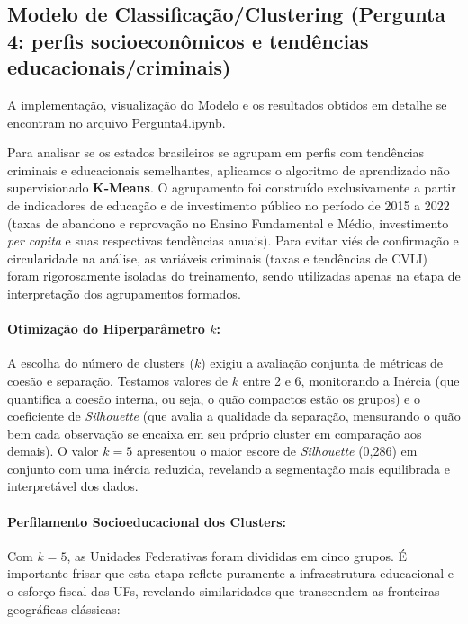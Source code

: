 \documentclass[10pt]{article}
\begin{document}
\subsection{Modelo de Classificação/Clustering (Pergunta 4: perfis socioeconômicos e tendências educacionais/criminais)}
A implementação, visualização do Modelo e os resultados obtidos em detalhe se encontram no arquivo \href{https://colab.research.google.com/drive/12nYmGO7BFKoq8rWuMHkxF5kdS1LSyS7U?usp=sharing}{Pergunta4.ipynb}.

Para analisar se os estados brasileiros se agrupam em perfis com tendências criminais e educacionais semelhantes, aplicamos o algoritmo de aprendizado não supervisionado \textbf{K-Means}. O agrupamento foi construído exclusivamente a partir de indicadores de educação e de investimento público no período de 2015 a 2022 (taxas de abandono e reprovação no Ensino Fundamental e Médio, investimento \textit{per capita} e suas respectivas tendências anuais). Para evitar viés de confirmação e circularidade na análise, as variáveis criminais (taxas e tendências de CVLI) foram rigorosamente isoladas do treinamento, sendo utilizadas apenas na etapa de interpretação dos agrupamentos formados.

\paragraph{Otimização do Hiperparâmetro $k$:}A escolha do número de clusters ($k$) exigiu a avaliação conjunta de métricas de coesão e separação. Testamos valores de $k$ entre 2 e 6, monitorando a Inércia (que quantifica a coesão interna, ou seja, o quão compactos estão os grupos) e o coeficiente de \textit{Silhouette} (que avalia a qualidade da separação, mensurando o quão bem cada observação se encaixa em seu próprio cluster em comparação aos demais). O valor $k=5$ apresentou o maior escore de \textit{Silhouette} (0,286) em conjunto com uma inércia reduzida, revelando a segmentação mais equilibrada e interpretável dos dados.

\paragraph{Perfilamento Socioeducacional dos Clusters:}Com $k=5$, as Unidades Federativas foram divididas em cinco grupos. É importante frisar que esta etapa reflete puramente a infraestrutura educacional e o esforço fiscal das UFs, revelando similaridades que transcendem as fronteiras geográficas clássicas:
\end{document}
